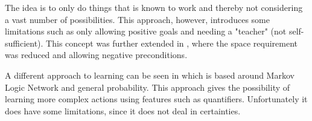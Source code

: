 The idea is to only do things that is known to work and thereby not considering a vast number of possibilities. This approach, however, introduces some limitations such as only allowing positive goals and needing a "teacher" (not self-sufficient). This concept was further extended in \cite{jacobsen2015a}, where the space requirement was reduced and allowing negative preconditions.

A different approach to learning can be seen in \cite{zhuo2010a} which is based around Markov Logic Network and general probability. This approach gives the possibility of learning more complex actions using features such as quantifiers. Unfortunately it does have some limitations, since it does not deal in certainties.
